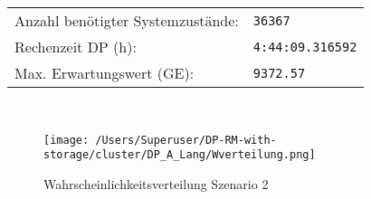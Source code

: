 \begin{table}[h!]
\begin{center}
\begin{tabular}{p{7cm}p{5cm}}
     Anzahl benötigter Systemzustände: & \texttt{36367} \\ 
     Rechenzeit DP (h): & \texttt{4:44:09.316592} \\ 
          Max. Erwartungswert (GE): & \texttt{9372.57} \\ \hline
         \end{tabular} \\[3mm]
  \end{center}
\end{table}

\begin{figure}[h!]
  \begin{center}
    \texttt{[image: /Users/Superuser/DP-RM-with-storage/cluster/DP\_A\_Lang/Wverteilung.png]}
    \caption{Wahrscheinlichkeitsverteilung Szenario 2}  \label{SB2}
  \end{center}
\end{figure}

